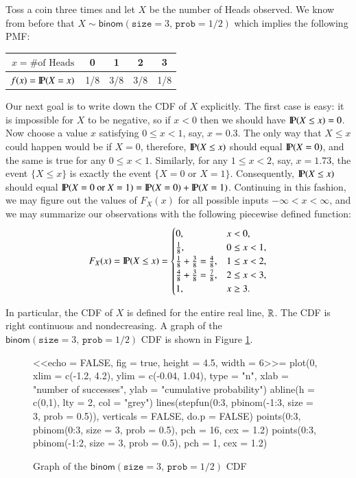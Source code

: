 \documentclass[captions=tableheading]{scrbook}
\begin{document}
\begin{example}
\label{exa:toss-coin-3-withR}
Toss a coin three times and let \(X\) be the number of Heads observed. We know from before that \(X\sim\mathsf{binom}(\mathtt{size}=3,\,\mathtt{prob}=1/2)\) which implies the following PMF:


\begin{table}[H]
\begin{tabular}{c|cccc}
\(x=\mbox{\#of Heads}\) & 0 & 1 & 2 & 3\tabularnewline
\hline
\(f(x)=\P(X=x)\) & 1/8 & 3/8 & 3/8 & 1/8\tabularnewline
\end{tabular}
\end{table}


Our next goal is to write down the CDF of \(X\) explicitly. The first case is easy: it is impossible for \(X\) to be negative, so if \(x<0\) then we should have \(\P(X\leq x)=0\). Now choose a value \(x\) satisfying \(0\leq x<1\), say, \(x=0.3\). The only way that \(X\leq x\) could happen would be if \(X=0\), therefore, \(\P(X\leq x)\) should equal \(\P(X=0)\), and the same is true for any \(0\leq x<1\). Similarly, for any \(1\leq x<2\), say, \(x=1.73\), the event \(\{ X\leq x \}\) is exactly the event \(\{ X=0\mbox{ or }X=1 \}\). Consequently, \(\P(X\leq x)\) should equal \(\P(X=0\mbox{ or }X=1)=\P(X=0)+\P(X=1)\). Continuing in this fashion, we may figure out the values of \(F_{X}(x)\) for all possible inputs \(-\infty<x<\infty\), and we may summarize our observations with the following piecewise defined function:
\[
F_{X}(x)=\P(X\leq x)=
\begin{cases}
0, & x<0,\\
\frac{1}{8}, & 0\leq x<1,\\
\frac{1}{8}+\frac{3}{8}=\frac{4}{8}, & 1\leq x<2,\\
\frac{4}{8}+\frac{3}{8}=\frac{7}{8}, & 2\leq x<3,\\
1, & x\geq3.
\end{cases}
\]


In particular, the CDF of \(X\) is defined for the entire real line, \(\R\). The CDF is right continuous and nondecreasing. A graph of the \(\mathsf{binom}(\mathtt{size}=3,\,\mathtt{prob}=1/2)\) CDF is shown in Figure \ref{fig:binom-cdf-base}.

\end{example}


\begin{figure}
<<echo = FALSE, fig = true, height = 4.5, width = 6>>=
plot(0, xlim = c(-1.2, 4.2), ylim = c(-0.04, 1.04), type = "n", xlab = "number of successes", ylab = "cumulative probability")
abline(h = c(0,1), lty = 2, col = "grey")
lines(stepfun(0:3, pbinom(-1:3, size = 3, prob = 0.5)), verticals = FALSE, do.p = FALSE)
points(0:3, pbinom(0:3, size = 3, prob = 0.5), pch = 16, cex = 1.2)
points(0:3, pbinom(-1:2, size = 3, prob = 0.5), pch = 1, cex = 1.2)

\caption{Graph of the \(\mathsf{binom}(\mathtt{size}=3,\,\mathtt{prob}=1/2)\) CDF\label{fig:binom-cdf-base}}

\end{figure}
\end{document}

